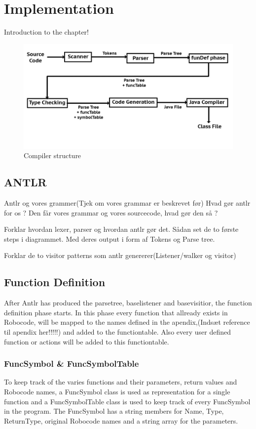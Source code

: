\chapter{Implementation}
Introduction to the chapter!

\begin{figure}[!ht]
\centering
\includegraphics[scale=0.35]{billeder/compilerStructure}
\caption{Compiler structure}
\label{cs}
\end{figure}


\section{ANTLR}
Antlr og vores grammer(Tjek om vores grammar er beskrevet før)
Hvad gør antlr for os ?
Den får vores grammar og vores sourcecode, hvad gør den så ?


Forklar hvordan lexer, parser og hvordan antlr gør det. Sådan set de to første steps i diagrammet. Med deres output i form af Tokens og Parse tree.

Forklar de to visitor patterns som antlr genererer(Listener/walker og visitor)
\section{Function Definition}
After Antlr has produced the parsetree, baselistener and basevisitior, the function definition phase starts. In this phase every function that allready exists in Robocode, will be mapped to the names defined in the apendix,(Indsæt reference til apendix her!!!!!) and added to the functiontable. Also every user defined function or actions will be added to this functiontable. 

\subsection{FuncSymbol \& FuncSymbolTable}
To keep track of the varies functions and their parameters, return values and Robocode names, a FuncSymbol class is used as representation for a single function and a FuncSymbolTable class is used to keep track of every FuncSymbol in the program.
The FuncSymbol has a string members for Name, Type, ReturnType, original Robocode names and a string array for the parameters.

